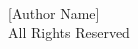 

\begin{titlepage}
\begin{singlespacing}
\begin{center}

\vspace*{35\baselineskip}

\textcopyright  \,  \the\year\\
\vspace{\baselineskip}	
[Author Name]\\
\vspace{\baselineskip}	
All Rights Reserved
\end{center}
\vfill

\end{singlespacing}
\end{titlepage}
